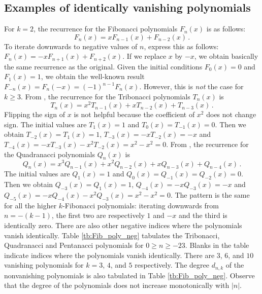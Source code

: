 \documentclass[review]{elsarticle}
\theoremstyle{plain}
\begin{document}
\subsection{Examples of identically vanishing polynomials}\label{sec:zero_poly}
For $k=2$, the recurrence for the Fibonacci polynomials $F_n(x)$ is as follows:
\begin{equation}  
F_n(x) = xF_{n-1}(x) +F_{n-2}(x) \,.
\end{equation}
To iterate downwards to negative values of $n$, express this as follows:
$F_n(x) = -xF_{n+1}(x) +F_{n+2}(x)$.
If we replace $x$ by $-x$, we obtain basically the same recurrence as the original.
Given the initial conditions $F_0(x)=0$ and $F_1(x)=1$, we obtain the well-known result
$F_{-n}(x) = F_n(-x) = (-1)^{n-1}F_n(x)$.
However, this is \emph{not} the case for $k\ge3$.
From \cite{HoggattBicknell_FibGen}, the recurrence for the Tribonacci polynomials $T_n(x)$ is
\begin{equation}  
T_n(x) = x^2T_{n-1}(x) +xT_{n-2}(x) +T_{n-3}(x) \,.
\end{equation}
Flipping the sign of $x$ is not helpful because the coefficient of $x^2$ does not change sign.
The initial values are $T_1(x) = 1$ and $T_0(x)=T_{-1}(x) = 0$.
Then we obtain
$T_{-2}(x) = T_1(x) =1$,
$T_{-3}(x) = -xT_{-2}(x) =-x$ and
$T_{-4}(x) = -xT_{-3}(x) -x^2T_{-2}(x) =x^2 -x^2 =0$.
From \cite{HoggattBicknell_FibGen}, the recurrence for the Quadranacci polynomials $Q_n(x)$ is
\begin{equation}
Q_n(x) = x^3Q_{n-1}(x) +x^2Q_{n-2}(x) +xQ_{n-3}(x) +Q_{n-4}(x) \,.
\end{equation}
The initial values are $Q_1(x) = 1$ and $Q_0(x)=Q_{-1}(x)=Q_{-2}(x) = 0$.
Then we obtain
$Q_{-3}(x) = Q_1(x) =1$,
$Q_{-4}(x) = -xQ_{-3}(x) =-x$ and
$Q_{-5}(x) = -xQ_{-4}(x) -x^2Q_{-3}(x) =x^2 -x^2 =0$.
The pattern is the same for all the higher $k$-Fibonacci polynomials:
iterating downwards from $n=-(k-1)$, the first two are respectively $1$ and $-x$ and the third is identically zero.
There are also other negative indices where the polynomials vanish identically.
Table \ref{tb:Fib_poly_neg} tabulates the Tribonacci, Quadranacci and Pentanacci polynomials for $0 \ge n \ge -23$.
Blanks in the table indicate indices where the polynomials vanish identically.
There are $3$, $6$, and $10$ vanishing polynomials for $k=3$, $4$, and $5$ respectively.
The degree $d_{n,k}$ of the nonvanishing polynomials is also tabulated in Table \ref{tb:Fib_poly_neg}.
Observe that the degree of the polynomials does not increase monotonically with $|n|$.
\end{document}
